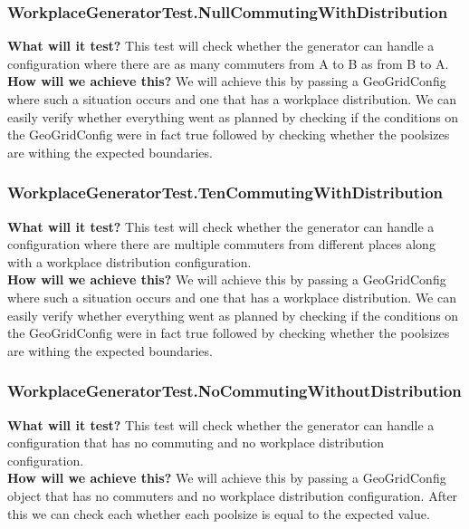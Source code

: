 \documentclass{article}
\begin{document}
\subsubsection{WorkplaceGeneratorTest.NullCommutingWithDistribution}
\textbf{What will it test?}
This test will check whether the generator can handle a configuration where there are as many commuters from A to B as from B to A.\\
\newline
\textbf{How will we achieve this?}
We will achieve this by passing a GeoGridConfig where such a situation occurs and one that has a workplace distribution. We can easily verify whether everything went as planned by checking if the conditions on the GeoGridConfig were in fact true followed by checking whether the poolsizes are withing the expected boundaries.

\subsubsection{WorkplaceGeneratorTest.TenCommutingWithDistribution}
\textbf{What will it test?}
This test will check whether the generator can handle a configuration where there are multiple commuters from different places along with a workplace distribution configuration.\\
\newline
\textbf{How will we achieve this?}
We will achieve this by passing a GeoGridConfig where such a situation occurs and one that has a workplace distribution. We can easily verify whether everything went as planned by checking if the conditions on the GeoGridConfig were in fact true followed by checking whether the poolsizes are withing the expected boundaries.

\subsubsection{WorkplaceGeneratorTest.NoCommutingWithoutDistribution}
\textbf{What will it test?}
This test will check whether the generator can handle a configuration that has no commuting and no workplace distribution configuration.\\
\newline
\textbf{How will we achieve this?}
We will achieve this by passing a GeoGridConfig object that has no commuters and no workplace distribution configuration. After this we can check each whether each poolsize is equal to the expected value.
\end{document}
